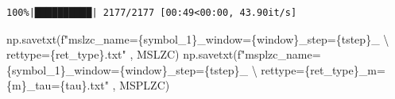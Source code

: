 \documentclass[
  letterpaper,
]{report}
\newenvironment{Shaded}{\begin{snugshade}}{\end{snugshade}}
\newcommand{\CharTok}[1]{\textcolor[rgb]{0.13,0.47,0.30}{#1}}
\newcommand{\NormalTok}[1]{\textcolor[rgb]{0.00,0.23,0.31}{#1}}
\newcommand{\SpecialCharTok}[1]{\textcolor[rgb]{0.37,0.37,0.37}{#1}}
\newcommand{\SpecialStringTok}[1]{\textcolor[rgb]{0.13,0.47,0.30}{#1}}
\begin{document}
\begin{verbatim}
100%|██████████| 2177/2177 [00:49<00:00, 43.90it/s]
\end{verbatim}

\begin{Shaded}
\begin{Highlighting}[]
\NormalTok{np.savetxt(}\SpecialStringTok{f"mslzc\_name=}\SpecialCharTok{\{}\NormalTok{symbol\_1}\SpecialCharTok{\}}\SpecialStringTok{\_window=}\SpecialCharTok{\{}\NormalTok{window}\SpecialCharTok{\}}\SpecialStringTok{\_step=}\SpecialCharTok{\{}\NormalTok{tstep}\SpecialCharTok{\}}\SpecialStringTok{\_ }\CharTok{\textbackslash{}}
\SpecialStringTok{    rettype=}\SpecialCharTok{\{}\NormalTok{ret\_type}\SpecialCharTok{\}}\SpecialStringTok{.txt"}\NormalTok{ , MSLZC)}
\NormalTok{np.savetxt(}\SpecialStringTok{f"msplzc\_name=}\SpecialCharTok{\{}\NormalTok{symbol\_1}\SpecialCharTok{\}}\SpecialStringTok{\_window=}\SpecialCharTok{\{}\NormalTok{window}\SpecialCharTok{\}}\SpecialStringTok{\_step=}\SpecialCharTok{\{}\NormalTok{tstep}\SpecialCharTok{\}}\SpecialStringTok{\_ }\CharTok{\textbackslash{}}
\SpecialStringTok{    rettype=}\SpecialCharTok{\{}\NormalTok{ret\_type}\SpecialCharTok{\}}\SpecialStringTok{\_m=}\SpecialCharTok{\{}\NormalTok{m}\SpecialCharTok{\}}\SpecialStringTok{\_tau=}\SpecialCharTok{\{}\NormalTok{tau}\SpecialCharTok{\}}\SpecialStringTok{.txt"}\NormalTok{ , MSPLZC)}
\end{Highlighting}
\end{Shaded}
\end{document}

